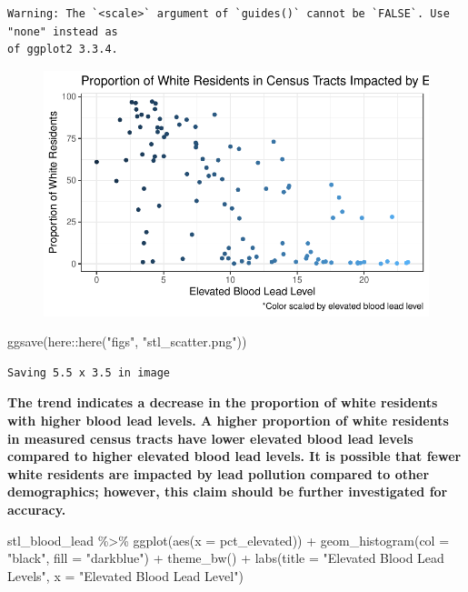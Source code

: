 \documentclass[
  letterpaper,
  DIV=11,
  numbers=noendperiod]{scrartcl}
\newenvironment{Shaded}{\begin{snugshade}}{\end{snugshade}}
\newcommand{\AttributeTok}[1]{\textcolor[rgb]{0.40,0.45,0.13}{#1}}
\newcommand{\FunctionTok}[1]{\textcolor[rgb]{0.28,0.35,0.67}{#1}}
\newcommand{\NormalTok}[1]{\textcolor[rgb]{0.00,0.23,0.31}{#1}}
\newcommand{\SpecialCharTok}[1]{\textcolor[rgb]{0.37,0.37,0.37}{#1}}
\newcommand{\StringTok}[1]{\textcolor[rgb]{0.13,0.47,0.30}{#1}}
\begin{document}
\begin{verbatim}
Warning: The `<scale>` argument of `guides()` cannot be `FALSE`. Use "none" instead as
of ggplot2 3.3.4.
\end{verbatim}

\begin{figure}[H]

{\centering \includegraphics{stl_lead_inequity_files/figure-pdf/unnamed-chunk-3-1.pdf}

}

\end{figure}

\begin{Shaded}
\begin{Highlighting}[]
\FunctionTok{ggsave}\NormalTok{(here}\SpecialCharTok{::}\FunctionTok{here}\NormalTok{(}\StringTok{"figs"}\NormalTok{, }\StringTok{"stl\_scatter.png"}\NormalTok{))}
\end{Highlighting}
\end{Shaded}

\begin{verbatim}
Saving 5.5 x 3.5 in image
\end{verbatim}

\textbf{The trend indicates a decrease in the proportion of white
residents with higher blood lead levels. A higher proportion of white
residents in measured census tracts have lower elevated blood lead
levels compared to higher elevated blood lead levels. It is possible
that fewer white residents are impacted by lead pollution compared to
other demographics; however, this claim should be further investigated
for accuracy.}

\begin{Shaded}
\begin{Highlighting}[]
\NormalTok{stl\_blood\_lead }\SpecialCharTok{\%\textgreater{}\%} \FunctionTok{ggplot}\NormalTok{(}\FunctionTok{aes}\NormalTok{(}\AttributeTok{x =}\NormalTok{ pct\_elevated)) }\SpecialCharTok{+} \FunctionTok{geom\_histogram}\NormalTok{(}\AttributeTok{col =} \StringTok{"black"}\NormalTok{, }\AttributeTok{fill =} \StringTok{"darkblue"}\NormalTok{) }\SpecialCharTok{+} \FunctionTok{theme\_bw}\NormalTok{() }\SpecialCharTok{+}  \FunctionTok{labs}\NormalTok{(}\AttributeTok{title =} \StringTok{"Elevated Blood Lead Levels"}\NormalTok{, }\AttributeTok{x =} \StringTok{"Elevated Blood Lead Level"}\NormalTok{) }
\end{Highlighting}
\end{Shaded}
\end{document}
